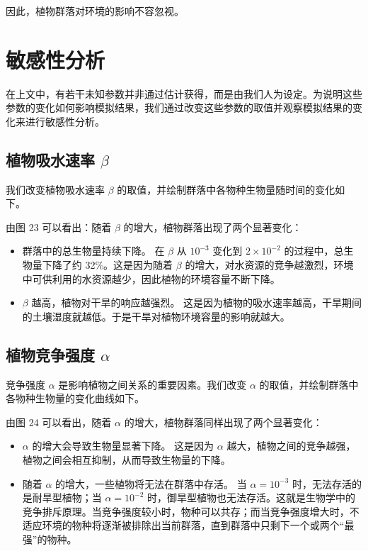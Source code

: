 \documentclass[11pt,a4paper]{ctexart}
\begin{document}
因此，植物群落对环境的影响不容忽视。

\section{敏感性分析}

在上文中，有若干未知参数并非通过估计获得，而是由我们人为设定。为说明这些参数的变化如何影响模拟结果，我们通过改变这些参数的取值并观察模拟结果的变化来进行敏感性分析。

\subsection{植物吸水速率 $\beta$}

我们改变植物吸水速率 $\beta$ 的取值，并绘制群落中各物种生物量随时间的变化如下。

由图 23 可以看出：随着 $\beta$ 的增大，植物群落出现了两个显著变化：

\begin{itemize}
\item 群落中的总生物量持续下降。
在 $\beta$ 从 $10^{-3}$ 变化到 $2\times 10^{-2}$ 的过程中，总生物量下降了约 32\%。这是因为随着 $\beta$ 的增大，对水资源的竞争越激烈，环境中可供利用的水资源越少，因此植物的环境容量不断下降。
\item $\beta$ 越高，植物对干旱的响应越强烈。
这是因为植物的吸水速率越高，干旱期间的土壤湿度就越低。于是干旱对植物环境容量的影响就越大。
\end{itemize}

\subsection{植物竞争强度 $\alpha$}

竞争强度 $\alpha$ 是影响植物之间关系的重要因素。我们改变 $\alpha$ 的取值，并绘制群落中各物种生物量的变化曲线如下。

由图 24 可以看出，随着 $\alpha$ 的增大，植物群落同样出现了两个显著变化：

\begin{itemize}
\item $\alpha$ 的增大会导致生物量显著下降。
这是因为 $\alpha$ 越大，植物之间的竞争越强，植物之间会相互抑制，从而导致生物量的下降。
\item 随着 $\alpha$ 的增大，一些植物将无法在群落中存活。
当 $\alpha=10^{-3}$ 时，无法存活的是耐旱型植物；当 $\alpha=10^{-2}$ 时，御旱型植物也无法存活。这就是生物学中的竞争排斥原理。当竞争强度较小时，物种可以共存；而当竞争强度增大时，不适应环境的物种将逐渐被排除出当前群落，直到群落中只剩下一个或两个“最强”的物种。
\end{itemize}
\end{document}
